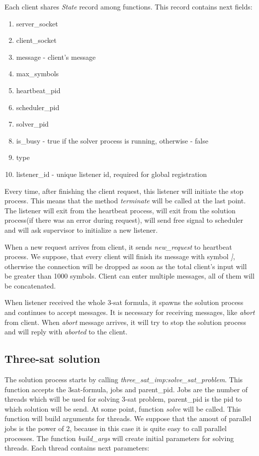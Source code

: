 \documentclass[11pt, a4paper]{scrartcl}
\begin{document}
Each client shares \emph{State} record among functions. This record contains next fields:

\begin{enumerate}
    \item server\_socket
    \item client\_socket 
    \item message  -  client's message
    \item max\_symbols
    \item heartbeat\_pid
    \item scheduler\_pid
    \item solver\_pid 
    \item is\_busy  - true if the solver process is running, otherwise - false
    \item type
    \item listener\_id - unique listener id, required for global registration
\end{enumerate}

Every time, after finishing the client request, this listener will initiate the stop process. This means that 
the method \emph{terminate} will be called at the last point. The listener will exit from the heartbeat process, will
exit from the solution process(if there was an error during request), will send free signal to scheduler and will ask supervisor to initialize a new listener. 

When a new request arrives from client, it sends \emph{new\_request} to heartbeat process. We suppose, that every client will finish its message with symbol \emph{]}, otherwise the connection will be dropped as soon as the total client's input will be greater than 1000 symbols. Client can enter multiple messages, all of them will be concatenated.

When listener received the whole 3-sat formula, it spawns the solution process and continues to accept messages.
It is necessary for receiving messages, like \emph{abort} from client.  When \emph{abort} message arrives, it will try to stop the solution process and will reply with \emph{aborted} to the client.


\subsection{Three-sat solution}

The solution process starts by calling \emph{three\_sat\_imp:solve\_sat\_problem}. This function accepts the 3sat-formula, jobs and parent\_pid. Jobs are the number of threads which will be used for solving 3-sat problem, parent\_pid is the pid to which solution will be send. At some point, function \emph{solve} will be called. 
This function will build arguments for threads. We suppose that the amout of parallel jobs is the power of 2,
because in this case it is quite easy to call parallel processes. The function \emph{build\_args} will create
initial parameters for solving threads. Each thread contains next parameters:
\end{document}
